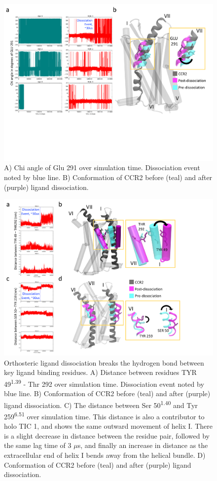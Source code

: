 \documentclass[9pt,twoside]{pnas-new}
\begin{document}
\begin{figure}
  \centering
  \includegraphics[width=\textwidth]{./figures/state35_glu291.png}
 \caption{A) Chi angle of Glu 291 over simulation time. Dissociation event noted by blue line. B) Conformation of CCR2 before (teal) and after (purple) ligand dissociation.}
  \label{fig:state35_glu291}
\end{figure}

\begin{figure}
  \centering
  \includegraphics[width=\textwidth]{./figures/state35_49-292_50-259.png}
 \caption{Orthosteric ligand dissociation breaks the hydrogen bond between key ligand binding residues. A) Distance between residues TYR 49\textsuperscript{1.39} - Thr 292 over simulation time. Dissociation event noted by blue line. B) Conformation of CCR2 before (teal) and after (purple) ligand dissociation. C) The distance between Ser 50\textsuperscript{1.40} and Tyr 259\textsuperscript{6.51} over simulation time. This distance is also a contributor to holo TIC 1, and shows the same outward movement of helix I. There is a slight decrease in distance between the residue pair, followed by the same lag time of 3 $\mu$s, and finally an increase in distance as the extracellular end of helix I bends away from the helical bundle. D) Conformation of CCR2 before (teal) and after (purple) ligand dissociation.}
  \label{fig:state35_49-292_50-259}
\end{figure}
\end{document}
